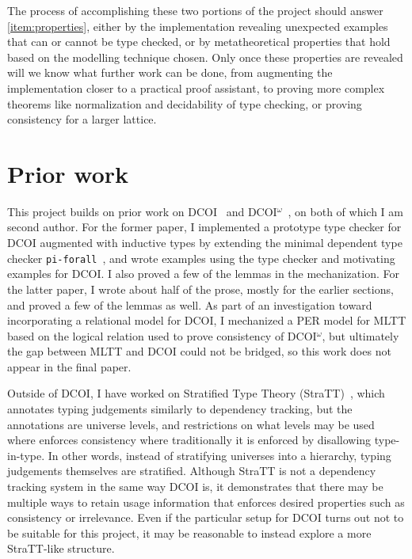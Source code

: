 \documentclass{article}
\begin{document}
The process of accomplishing these two portions of the project
should answer \cref{item:properties},
either by the implementation revealing unexpected examples that can or cannot be type checked,
or by metatheoretical properties that hold based on the modelling technique chosen.
Only once these properties are revealed will we know what further work can be done,
from augmenting the implementation closer to a practical proof assistant,
to proving more complex theorems like normalization and decidability of type checking,
or proving consistency for a larger lattice.

\section{Prior work} \label{sec:prior}

This project builds on prior work on DCOI~\citep{dcoi} and DCOI$^\omega$~\citep{dcoi-omega},
on both of which I am second author.
For the former paper,
I implemented a prototype type checker for DCOI augmented with inductive types
by extending the minimal dependent type checker \texttt{pi-forall}~\citep{pi-forall},
and wrote examples using the type checker and motivating examples for DCOI.
I also proved a few of the lemmas in the mechanization.
For the latter paper,
I wrote about half of the prose, mostly for the earlier sections,
and proved a few of the lemmas as well.
As part of an investigation toward incorporating a relational model for DCOI,
I mechanized a PER model for MLTT based on the logical relation
used to prove consistency of DCOI$^\omega$,
but ultimately the gap between MLTT and DCOI could not be bridged,
so this work does not appear in the final paper.

Outside of DCOI, I have worked on Stratified Type Theory (StraTT)~\citep{stratt},
which annotates typing judgements similarly to dependency tracking,
but the annotations are universe levels,
and restrictions on what levels may be used where enforces consistency
where traditionally it is enforced by disallowing type-in-type.
In other words, instead of stratifying universes into a hierarchy,
typing judgements themselves are stratified.
Although StraTT is not a dependency tracking system in the same way DCOI is,
it demonstrates that there may be multiple ways to retain usage information
that enforces desired properties such as consistency or irrelevance.
Even if the particular setup for DCOI turns out not to be suitable for this project,
it may be reasonable to instead explore a more StraTT-like structure.
\end{document}
